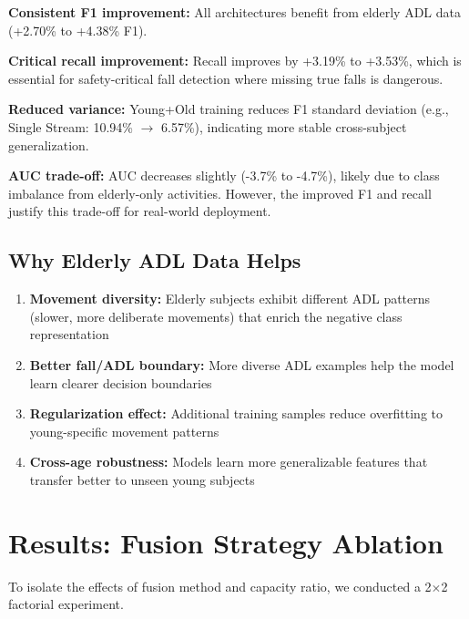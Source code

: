 \documentclass{article}
\begin{document}
\begin{tcolorbox}[colback=green!5,colframe=green!50!black,title=\textbf{Age-Diverse Training Improves All Models}]
\textbf{Consistent F1 improvement:} All architectures benefit from elderly ADL data (+2.70\% to +4.38\% F1).

\textbf{Critical recall improvement:} Recall improves by +3.19\% to +3.53\%, which is essential for safety-critical fall detection where missing true falls is dangerous.

\textbf{Reduced variance:} Young+Old training reduces F1 standard deviation (e.g., Single Stream: 10.94\% $\rightarrow$ 6.57\%), indicating more stable cross-subject generalization.

\textbf{AUC trade-off:} AUC decreases slightly (-3.7\% to -4.7\%), likely due to class imbalance from elderly-only activities. However, the improved F1 and recall justify this trade-off for real-world deployment.
\end{tcolorbox}

\subsection{Why Elderly ADL Data Helps}

\begin{enumerate}
    \item \textbf{Movement diversity:} Elderly subjects exhibit different ADL patterns (slower, more deliberate movements) that enrich the negative class representation
    \item \textbf{Better fall/ADL boundary:} More diverse ADL examples help the model learn clearer decision boundaries
    \item \textbf{Regularization effect:} Additional training samples reduce overfitting to young-specific movement patterns
    \item \textbf{Cross-age robustness:} Models learn more generalizable features that transfer better to unseen young subjects
\end{enumerate}

\section{Results: Fusion Strategy Ablation}

To isolate the effects of fusion method and capacity ratio, we conducted a 2$\times$2 factorial experiment.
\end{document}
